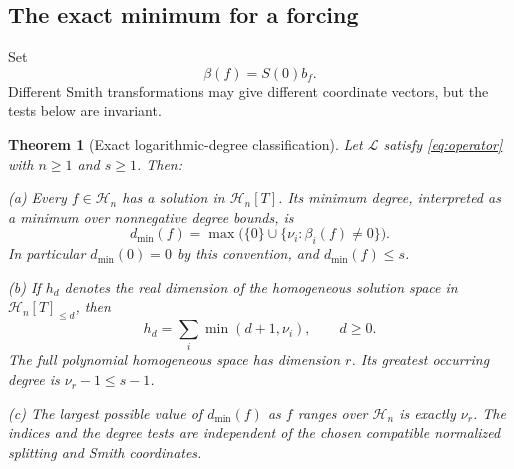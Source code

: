 \documentclass[11pt,a4paper]{article}
\numberwithin{equation}{section}
\newtheorem{theorem}{Theorem}[section]
\theoremstyle{definition}
\theoremstyle{remark}
\theoremstyle{definition}
\newcommand{\Hh}{\mathcal H}
\newcommand{\Ll}{\mathcal L}
\begin{document}
\subsection{The exact minimum for a forcing}
Set
\begin{equation}
 \beta(f)=S(0)b_f.
 \label{eq:beta}
\end{equation}
Different Smith transformations may give different coordinate vectors, but the tests below are invariant.

\begin{theorem}[Exact logarithmic-degree classification]
\label{thm:smith-degree}
Let $\Ll$ satisfy \eqref{eq:operator} with $n\ge1$ and $s\ge1$. Then:

\smallskip
\noindent\textup{(a)} Every $f\in\Hh_n$ has a solution in $\Hh_n[T]$. Its minimum degree, interpreted as a minimum over nonnegative degree bounds, is
\begin{equation}
 d_{\min}(f)=\max\bigl(\{0\}\cup\{\nu_i:\beta_i(f)\ne0\}\bigr).
 \label{eq:dmin}
\end{equation}
In particular $d_{\min}(0)=0$ by this convention, and $d_{\min}(f)\le s$.

\smallskip
\noindent\textup{(b)} If $h_d$ denotes the real dimension of the homogeneous solution space in $\Hh_n[T]_{\le d}$, then
\begin{equation}
 h_d=\sum_i\min(d+1,\nu_i),\qquad d\ge0.
 \label{eq:hd}
\end{equation}
The full polynomial homogeneous space has dimension $r$. Its greatest occurring degree is $\nu_r-1\le s-1$.

\smallskip
\noindent\textup{(c)} The largest possible value of $d_{\min}(f)$ as $f$ ranges over $\Hh_n$ is exactly $\nu_r$. The indices and the degree tests are independent of the chosen compatible normalized splitting and Smith coordinates.
\end{theorem}
\end{document}
